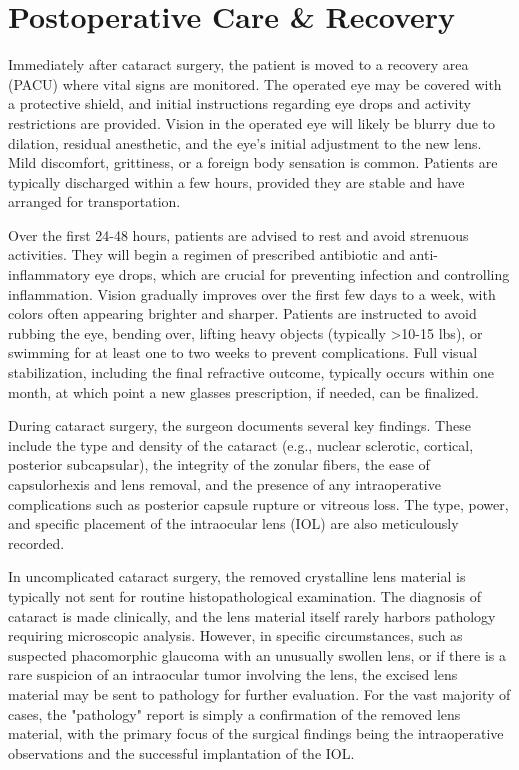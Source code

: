 \section*{Postoperative Care \& Recovery}
Immediately after cataract surgery, the patient is moved to a recovery area (PACU) where vital signs are monitored. The operated eye may be covered with a protective shield, and initial instructions regarding eye drops and activity restrictions are provided. Vision in the operated eye will likely be blurry due to dilation, residual anesthetic, and the eye's initial adjustment to the new lens. Mild discomfort, grittiness, or a foreign body sensation is common. Patients are typically discharged within a few hours, provided they are stable and have arranged for transportation.

Over the first 24-48 hours, patients are advised to rest and avoid strenuous activities. They will begin a regimen of prescribed antibiotic and anti-inflammatory eye drops, which are crucial for preventing infection and controlling inflammation. Vision gradually improves over the first few days to a week, with colors often appearing brighter and sharper. Patients are instructed to avoid rubbing the eye, bending over, lifting heavy objects (typically >10-15 lbs), or swimming for at least one to two weeks to prevent complications. Full visual stabilization, including the final refractive outcome, typically occurs within one month, at which point a new glasses prescription, if needed, can be finalized.

During cataract surgery, the surgeon documents several key findings. These include the type and density of the cataract (e.g., nuclear sclerotic, cortical, posterior subcapsular), the integrity of the zonular fibers, the ease of capsulorhexis and lens removal, and the presence of any intraoperative complications such as posterior capsule rupture or vitreous loss. The type, power, and specific placement of the intraocular lens (IOL) are also meticulously recorded.

In uncomplicated cataract surgery, the removed crystalline lens material is typically not sent for routine histopathological examination. The diagnosis of cataract is made clinically, and the lens material itself rarely harbors pathology requiring microscopic analysis. However, in specific circumstances, such as suspected phacomorphic glaucoma with an unusually swollen lens, or if there is a rare suspicion of an intraocular tumor involving the lens, the excised lens material may be sent to pathology for further evaluation. For the vast majority of cases, the "pathology" report is simply a confirmation of the removed lens material, with the primary focus of the surgical findings being the intraoperative observations and the successful implantation of the IOL.

